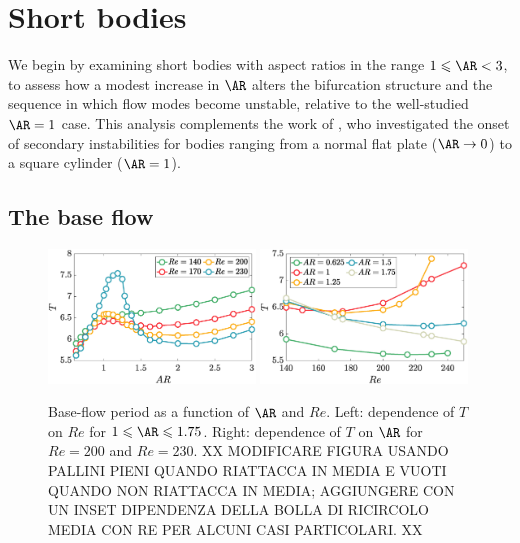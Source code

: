 \section{Short bodies}
\label{sec:short}


We begin by examining short bodies with aspect ratios in the range $1 \le \AR <3$, to assess how a modest increase in $\AR$ alters the bifurcation structure and the sequence in which flow modes become unstable, relative to the well-studied $\AR=1$ case. This analysis complements the work of \cite{choi-yang-2014}, who investigated the onset of secondary instabilities for bodies ranging from a normal flat plate ($\AR \rightarrow 0$) to a square cylinder ($\AR=1$).

\subsection{The base flow}

\begin{figure}
  \centering
  \includegraphics[width=0.49\textwidth]{./fig/AR1s/T_AR.eps}
  \includegraphics[width=0.49\textwidth]{./fig/AR1s/T_Re.eps}
  \caption{Base-flow period as a function of $\AR$ and $Re$. Left: dependence of $T$ on $Re$ for $1 \le \AR \le 1.75$. Right: dependence of $T$ on $\AR$ for $Re=200$ and $Re=230$. XX MODIFICARE FIGURA USANDO PALLINI PIENI QUANDO RIATTACCA IN MEDIA E VUOTI QUANDO NON RIATTACCA IN MEDIA; AGGIUNGERE CON UN INSET DIPENDENZA DELLA BOLLA DI RICIRCOLO MEDIA CON RE PER ALCUNI CASI PARTICOLARI. XX}
  \label{fig:T_Re_small}
\end{figure}
%

